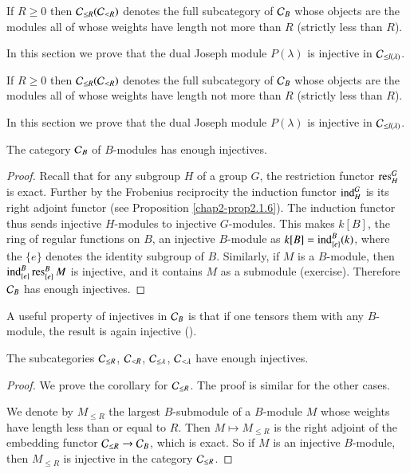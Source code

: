 If $R\geq 0$ then $\mathcal{C}_{\leq R}(\mathcal{C}_{<R})$ denotes the full subcategory
of $\mathcal{C}_{B}$ whose objects are the modules all of whose weights have
length not more than $R$ (strictly less than $R$).

In this section we prove that the dual Joseph module $P(\lambda)$ is
injective in $\mathcal{C}_{\leq l(\lambda)}$. 

If $R\geq 0$ then $\mathcal{C}_{\leq R}(\mathcal{C}_{<R})$ denotes the full subcategory
of $\mathcal{C}_{B}$ whose objects are the modules all of whose weights have
length not more than $R$ (strictly less than $R$).

In this section we prove that the dual Joseph module $P(\lambda)$ is
injective in $\mathcal{C}_{\leq l(\lambda)}$.

\begin{lemma}\label{chap3-lem3.1.1}
The category $\mathcal{C}_{B}$ of $B$-modules has enough injectives.
\end{lemma}

\begin{proof}
Recall that for any subgroup $H$ of a group $G$, the restriction
functor $\operatorname{res}^{G}_{H}$ is exact. Further by the Frobenius reciprocity
the induction functor $\operatorname{ind}^{G}_{H}$ is its right adjoint functor (see
Proposition \ref{chap2-prop2.1.6}). The induction functor thus sends
injective 
$H$-modules to injective $G$-modules. This makes $k[B]$, the
ring of regular functions 
on $B$, an injective $B$-module as
$k[B]=\operatorname{ind}^{B}_{\{e\}}(k)$, where the $\{e\}$ denotes the identity
subgroup of $B$. Similarly, if $M$ is a $B$-module, then
$\operatorname{ind}^{B}_{\{e\}}\operatorname{res}^{B}_{\{e\}}M$ is injective, and it contains $M$
as a submodule (exercise). Therefore $\mathcal{C}_{B}$ has enough injectives. 
\end{proof}

\begin{remark}\label{chap3-rem3.1.2}
A useful property of injectives in $\mathcal{C}_{B}$ is that if one tensors
them with any $B$-module, the result is again injective (\cite[I
  3.10]{key11}). 
\end{remark}

\begin{corollary}\label{chap3-coro3.1.3}
The subcategories $\mathcal{C}_{\leq R}$, $\mathcal{C}_{< R}$, $\mathcal{C}_{\leq \lambda}$,
$\mathcal{C}_{<\lambda}$ have enough injectives.
\end{corollary}

\begin{proof}
We prove the corollary for $\mathcal{C}_{\leq R}$. The proof is similar for the
other cases.

We denote by $M_{\leq R}$ the largest $B$-submodule of a $B$-module
$M$ whose weights have length less than or equal to $R$. Then
$M\mapsto M_{\leq R}$ is the right adjoint of the embedding functor
$\mathcal{C}_{\leq R}\to \mathcal{C}_{B}$, which is exact. So if $M$ is an injective
$B$-module, then $M_{\leq R}$ is injective in the category $\mathcal{C}_{\leq R}$.
\end{proof}

